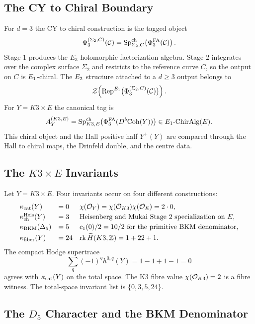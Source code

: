 \subsection*{The CY to Chiral Boundary}
\label{note:cy-to-chiral-boundary}

For \(d=3\) the CY to chiral construction is the tagged object
\[
 \Phi_3^{(\Sigma_2,C)}(\mathcal C)
 =
 \mathrm{Sp}^{\mathrm{ch}}_{\Sigma_2,C}\!\left(\Phi^{\mathrm{FA}}_3(\mathcal C)\right).
\]
Stage \(1\) produces the \(E_3\) holomorphic factorization algebra.
Stage \(2\) integrates over the complex surface \(\Sigma_2\) and
restricts to the reference curve \(C\), so the output on \(C\) is
\(E_1\)-chiral. The \(E_2\) structure attached to a \(d\geq 3\)
output belongs to
\[
 \mathcal{Z}\!\left(\mathrm{Rep}^{E_1}
 \bigl(\Phi_3^{(\Sigma_2,C)}(\mathcal C)\bigr)\right).
\]
For \(Y=K3\times E\) the canonical tag is
\[
 A_Y^{(K3,E)}
 =
 \mathrm{Sp}^{\mathrm{ch}}_{K3,E}\!\left(\Phi^{\mathrm{FA}}_3(D^b\mathrm{Coh}(Y))\right)
 \in E_1\text{-}\mathrm{ChirAlg}(E).
\]
This chiral object and the Hall positive half \(Y^+(Y)\) are compared
through the Hall to chiral maps, the Drinfeld double, and the centre
data.

\subsection*{The $K3\times E$ Invariants}
\label{note:k3xe-invariants}

Let \(Y=K3\times E\). Four invariants occur on four different
constructions:
\[
\begin{array}{lll}
\kappa_{\mathrm{cat}}(Y) & =0
& \chi(\mathcal{O}_Y)=\chi(\mathcal{O}_{K3})\chi(\mathcal{O}_E)=2\cdot 0,\\[0.25em]
\kappa_{\mathrm{ch}}^{\mathrm{Heis}}(Y) & =3
& \text{Heisenberg and Mukai Stage \(2\) specialization on }E,\\[0.25em]
\kappa_{\mathrm{BKM}}(\Delta_5) & =5
& c_1(0)/2=10/2\text{ for the primitive BKM denominator},\\[0.25em]
\kappa_{\mathrm{fiber}}(Y) & =24
& \mathrm{rk}\,\widetilde H(K3,\mathbb{Z})=1+22+1.
\end{array}
\]
The compact Hodge supertrace
\[
 \sum_q(-1)^q h^{0,q}(Y)=1-1+1-1=0
\]
agrees with \(\kappa_{\mathrm{cat}}(Y)\) on the total space. The K3 fibre value
\(\chi(\mathcal{O}_{K3})=2\) is a fibre witness. The total-space invariant
list is \(\{0,3,5,24\}\).

\subsection*{The $D_5$ Character and the BKM Denominator}
\label{note:d5-character}

